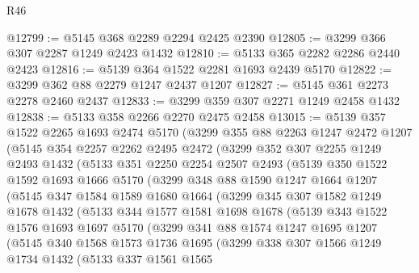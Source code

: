 \begin{lexlean}{R46}
\begin{coremodule}
@12799 := @5145 @368 @2289 @2294 @2425 @2390
@12805 := @3299 @366 @307 @2287 @1249 @2423 @1432
@12810 := @5133 @365 @2282 @2286 @2440 @2423
@12816 := @5139 @364 @1522 @2281 @1693 @2439 @5170
@12822 := @3299 @362 @88 @2279 @1247 @2437 @1207
@12827 := @5145 @361 @2273 @2278 @2460 @2437
@12833 := @3299 @359 @307 @2271 @1249 @2458 @1432
@12838 := @5133 @358 @2266 @2270 @2475 @2458
@13015 := @5139
    @357
    @1522
    @2265
    @1693
    @2474
    @5170
    (@3299
      @355
      @88
      @2263
      @1247
      @2472
      @1207
      (@5145
        @354
        @2257
        @2262
        @2495
        @2472
        (@3299
          @352
          @307
          @2255
          @1249
          @2493
          @1432
          (@5133
            @351
            @2250
            @2254
            @2507
            @2493
            (@5139
              @350
              @1522
              @1592
              @1693
              @1666
              @5170
              (@3299
                @348
                @88
                @1590
                @1247
                @1664
                @1207
                (@5145
                  @347
                  @1584
                  @1589
                  @1680
                  @1664
                  (@3299
                    @345
                    @307
                    @1582
                    @1249
                    @1678
                    @1432
                    (@5133
                      @344
                      @1577
                      @1581
                      @1698
                      @1678
                      (@5139
                        @343
                        @1522
                        @1576
                        @1693
                        @1697
                        @5170
                        (@3299
                          @341
                          @88
                          @1574
                          @1247
                          @1695
                          @1207
                          (@5145
                            @340
                            @1568
                            @1573
                            @1736
                            @1695
                            (@3299
                              @338
                              @307
                              @1566
                              @1249
                              @1734
                              @1432
                              (@5133
                                @337
                                @1561
                                @1565

\end{coremodule}
\end{lexlean}
